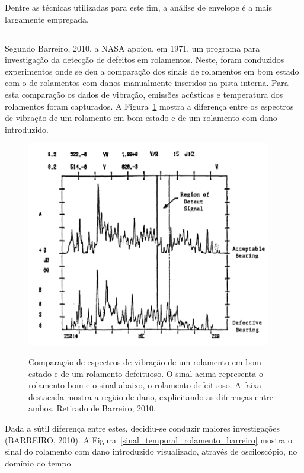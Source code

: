\documentclass[
	12pt,				
	oneside,			
	a4paper,			
	english,			
	brazil,			
	]{abntex2ppgsi}
\begin{document}
Dentre as técnicas utilizadas para este fim, a análise de envelope é a mais largamente empregada. 

\subsection{}

Segundo Barreiro, 2010, a NASA apoiou, em 1971, um programa para investigação da detecção de defeitos em rolamentos. Neste, foram conduzidos experimentos onde se deu a comparação dos sinais de rolamentos em bom estado com o de rolamentos com danos manualmente inseridos na pista interna. Para esta comparação os dados de vibração, emissões acústicas e temperatura dos rolamentos foram capturados. A Figura~\ref{fft_sinal_barreiro} mostra a diferença entre os espectros de vibração de um rolamento em bom estado e de um rolamento com dano introduzido.

\begin{figure}[H]
\centering
\caption {Comparação de espectros de vibração de um rolamento em bom estado e de um rolamento defeituoso. O sinal acima representa o rolamento bom e o sinal abaixo, o rolamento defeituoso. A faixa destacada mostra a região de dano, explicitando as diferenças entre ambos. Retirado de Barreiro, 2010.}
\includegraphics[width=\textwidth,height=90mm,keepaspectratio]{fft_sinal_barreiro}
\label{fft_sinal_barreiro}
\end{figure}

Dada a sútil diferença entre estes, decidiu-se conduzir maiores investigações (BARREIRO, 2010). A Figura~\ref{sinal_temporal_rolamento_barreiro} mostra o sinal do rolamento com dano introduzido visualizado, através de osciloscópio, no domínio do tempo.
\end{document}
